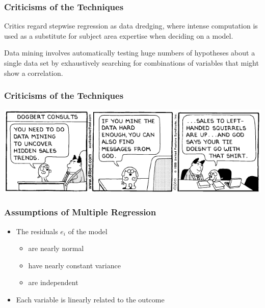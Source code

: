 \documentclass[handout]{beamer}
\newcommand{\blue}[1]{\textcolor{blue2}{#1}}
\begin{document}
\begin{frame}[fragile]
\frametitle{Criticisms of the Techniques}

Critics regard stepwise regression as \blue{data dredging}, where intense computation is used as a substitute for subject area expertise when deciding on a model.  

\pause
\vspace{0.5cm}

\blue{Data mining} involves automatically testing huge numbers of hypotheses about a single data set by exhaustively searching for combinations of variables that might show a correlation.

\end{frame}


\begin{frame}[fragile]
\frametitle{Criticisms of the Techniques}
\begin{center}
\includegraphics[width=\textwidth]{figure/dilbert.png}
\end{center}
\end{frame}


\begin{frame}[fragile]
\frametitle{Assumptions of Multiple Regression}

\begin{itemize}
\item The residuals $e_i$ of the model 
\begin{itemize}
\pause\item are nearly normal
\pause\item have nearly constant variance
\pause\item are independent
\end{itemize}
\pause\item Each variable is linearly related to the outcome
\end{itemize}

\end{frame}
\end{document}
